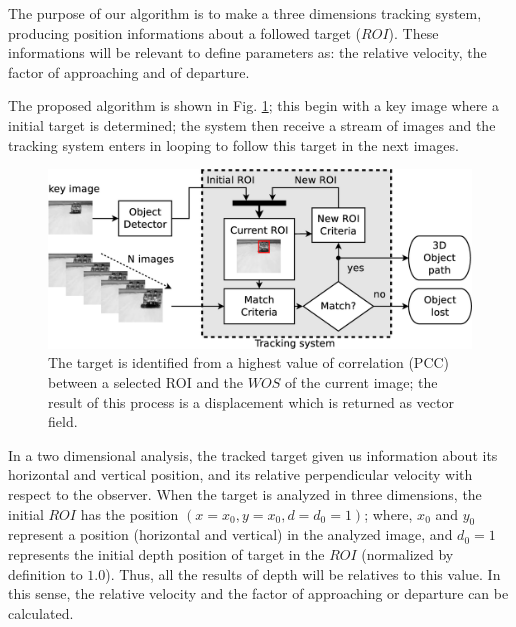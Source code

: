 The purpose of our algorithm is to make a three dimensions tracking system, producing position informations 
about a followed target ($ROI$).
These informations will be relevant to define parameters 
as: the relative velocity, the factor of approaching and of departure.

The proposed algorithm is shown in Fig. \ref{fig:system};
this begin with a key image where a initial target is determined; 
the system then receive a stream of images and the tracking system 
enters in looping to follow this target in the next images.

\begin{figure}[bhp]
\includegraphics[width=\columnwidth]{images/figure1-diagram1.eps}
\caption{The target is identified from a highest value of correlation (PCC) between a selected ROI and 
the $WOS$ of the current image; the result of this process is a displacement which is  returned as vector field.}
\label{fig:system}
\end{figure}

In a two dimensional analysis, the tracked target given us information about its horizontal 
and vertical position, and its relative perpendicular velocity with respect to the observer.
When the target is analyzed in three dimensions, 
the initial $ROI$ has the position $(x=x_0,y=x_0,d=d_0=1)$;
where, $x_0$ and $y_0$ represent a position (horizontal and vertical) in the analyzed image,
and $d_0=1$ represents the initial depth position of target in the $ROI$ (normalized by definition to $1.0$).
Thus, all the results of depth will be relatives to this value. In this sense, the relative velocity and 
the factor of approaching or departure can be calculated.

